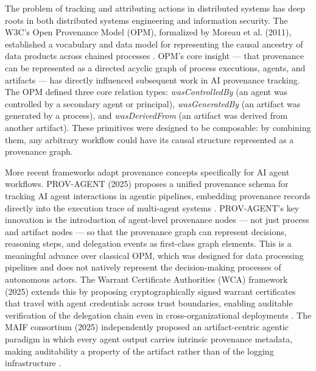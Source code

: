 The problem of tracking and attributing actions in distributed systems has deep roots in both distributed systems engineering and information security. The W3C's Open Provenance Model (OPM), formalized by Moreau et al. (2011), established a vocabulary and data model for representing the causal ancestry of data products across chained processes \cite{moreau2015-prov}. OPM's core insight — that provenance can be represented as a directed acyclic graph of process executions, agents, and artifacts — has directly influenced subsequent work in AI provenance tracking. The OPM defined three core relation types: \textit{wasControlledBy} (an agent was controlled by a secondary agent or principal), \textit{wasGeneratedBy} (an artifact was generated by a process), and \textit{wasDerivedFrom} (an artifact was derived from another artifact). These primitives were designed to be composable: by combining them, any arbitrary workflow could have its causal structure represented as a provenance graph.

More recent frameworks adapt provenance concepts specifically for AI agent workflows. PROV-AGENT (2025) proposes a unified provenance schema for tracking AI agent interactions in agentic pipelines, embedding provenance records directly into the execution trace of multi-agent systems \cite{prov-agent2025}. PROV-AGENT's key innovation is the introduction of agent-level provenance nodes — not just process and artifact nodes — so that the provenance graph can represent decisions, reasoning steps, and delegation events as first-class graph elements. This is a meaningful advance over classical OPM, which was designed for data processing pipelines and does not natively represent the decision-making processes of autonomous actors. The Warrant Certificate Authorities (WCA) framework (2025) extends this by proposing cryptographically signed warrant certificates that travel with agent credentials across trust boundaries, enabling auditable verification of the delegation chain even in cross-organizational deployments \cite{wca2025}. The MAIF consortium (2025) independently proposed an artifact-centric agentic paradigm in which every agent output carries intrinsic provenance metadata, making auditability a property of the artifact rather than of the logging infrastructure \cite{maif2025arxiv}.

